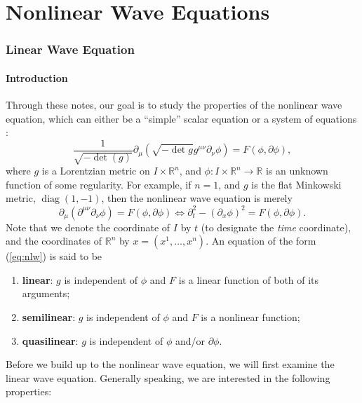 \documentclass{article}
\begin{document}
\part{Nonlinear Wave Equations}
\section{Linear Wave Equation}\label{sec:lwe}

\subsection{Introduction} 
Through these notes, our goal is to study the properties of the nonlinear wave equation, which can either be a ``simple'' scalar equation or a system of equations \cite{Luk}: 
\begin{equation}
	\frac{1}{\sqrt{-\det(g)}}\partial_{\mu}\left(\sqrt{-\det{g}}g^{\mu\nu}\partial_{\nu}\phi\right) = F(\phi, \partial \phi) 
	\label{eq:nlw}, 
\end{equation}
where $g$ is a Lorentzian metric on $I \times \mathbb{R}^{n}$, and $\phi: I \times \mathbb{R}^{n} \to \mathbb{R}$ is an unknown function of some regularity. For example, if $n = 1$, and $g$ is the flat Minkowski metric, $\operatorname{diag}(1,-1)$, then the nonlinear wave equation is merely 
\begin{equation*}
	\partial_{\mu}(\partial^{\mu\nu}\partial_{\nu}\phi) = F(\phi, \partial \phi) \iff \partial_{t}^{2} - (\partial_{x}\phi)^{2} = F(\phi, \partial \phi). 
\end{equation*}
Note that we denote the coordinate of $I$ by $t$ (to designate the \textit{time} coordinate), and the coordinates of $\mathbb{R}^{n}$ by $x = (x^{1}, \ldots, x^{n})$. An equation of the form (\ref{eq:nlw}) is said to be \vspace{-1.2em}
\begin{enumerate}[itemsep =-2pt,label = (\roman{*})]
	\item \textbf{linear}: $g$ is independent of $\phi$ and $F$ is a linear function of both of its arguments;
	\item \textbf{semilinear}: $g$ is independent of $\phi$  and $F$ is a nonlinear function; 
	\item \textbf{quasilinear}: $g$ is independent of $\phi$ and/or $\partial \phi$. 
\end{enumerate}
Before we build up to the nonlinear wave equation, we will first examine the linear wave equation. Generally speaking, we are interested in the following properties: \vspace{-1.2em}
\end{document}
